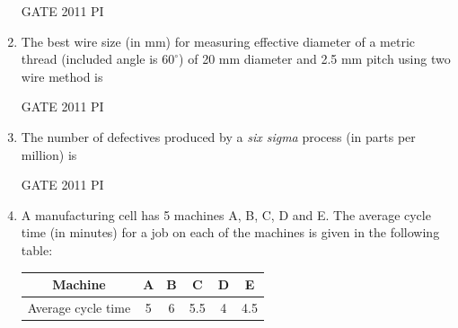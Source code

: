 \documentclass[journal,12pt,onecolumn]{IEEEtran}
\theoremstyle{remark}
\begin{document}
\begin{enumerate}
\hfill GATE 2011 PI  

\begin{enumerate}
\end{enumerate}

\item The best wire size (in mm) for measuring effective diameter of a metric thread (included angle is $60^\circ$) of 20 mm diameter and 2.5 mm pitch using two wire method is  

\hfill GATE 2011 PI  

\begin{enumerate}
\end{enumerate}

\item The number of defectives produced by a \textit{six sigma} process (in parts per million) is  

\hfill GATE 2011 PI  

\begin{enumerate}
\end{enumerate}

\item A manufacturing cell has 5 machines A, B, C, D and E. The average cycle time (in minutes) for a job on each of the machines is given in the following table:  

\begin{center}
\begin{tabular}{|c|c|c|c|c|c|}
\hline
Machine & A & B & C & D & E \\ \hline
Average cycle time & 5 & 6 & 5.5 & 4 & 4.5 \\ \hline
\end{tabular}
\end{center}


\end{enumerate}
\end{document}
